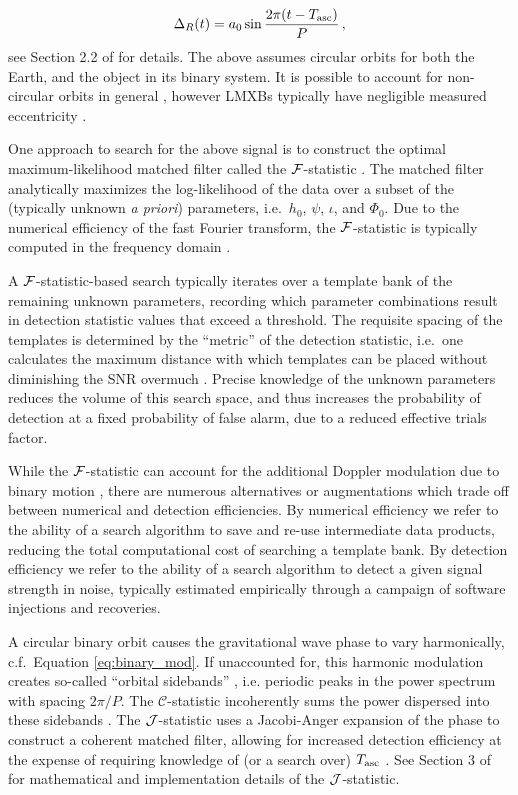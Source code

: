 \begin{equation}
    \Delta_R(t) = a_0 \sin \frac{2\pi(t - T_{\rm asc})}{P}\,, \label{eq:binary_mod}
\end{equation}
see Section 2.2 of \citet{Wette2023} for details. The above assumes circular orbits for both the Earth, and the object in its binary system. It is possible to account for non-circular orbits in general \citep{Leaci2015}, however LMXBs typically have negligible measured eccentricity \citep{Bhattacharyya2022}.

One approach to search for the above signal is to construct the optimal maximum-likelihood matched filter called the $\mathcal{F}$-statistic \citep{JKS98}. The matched filter analytically maximizes the log-likelihood of the data over a subset of the (typically unknown \emph{a priori}) parameters, i.e.~$h_0$, $\psi$, $\iota$, and $\Phi_0$. Due to the numerical efficiency of the fast Fourier transform, the $\mathcal{F}$-statistic is typically computed in the frequency domain \citep{JKS98,Prix2009a}.

A $\mathcal{F}$-statistic-based search typically iterates over a template bank of the remaining unknown parameters, recording which parameter combinations result in detection statistic values that exceed a threshold. The requisite spacing of the templates is determined by the ``metric'' of the detection statistic, i.e.~one calculates the maximum distance with which templates can be placed without diminishing the SNR overmuch \citep{Leaci2015}. Precise knowledge of the unknown parameters reduces the volume of this search space, and thus increases the probability of detection at a fixed probability of false alarm, due to a reduced effective trials factor.

While the $\mathcal{F}$-statistic can account for the additional Doppler modulation due to binary motion \citep{LAL2018}, there are numerous alternatives or augmentations which trade off between numerical and detection efficiencies. By numerical efficiency we refer to the ability of a search algorithm to save and re-use intermediate data products, reducing the total computational cost of searching a template bank. By detection efficiency we refer to the ability of a search algorithm to detect a given signal strength in noise, typically estimated empirically through a campaign of software injections and recoveries. 

A circular binary orbit causes the gravitational wave phase to vary harmonically, c.f.~Equation \eqref{eq:binary_mod}. If unaccounted for, this harmonic modulation creates so-called ``orbital sidebands'' \citep{Messenger2007,Sammut2014}, i.e. periodic peaks in the power spectrum with spacing $2\pi/P$. The $\mathcal{C}$-statistic incoherently sums the power dispersed into these sidebands \citep{Sammut2014}. The $\mathcal{J}$-statistic uses a Jacobi-Anger expansion of the phase to construct a coherent matched filter, allowing for increased detection efficiency at the expense of requiring knowledge of (or a search over) $T_{\rm asc}$ \citep{Suvorova2017}. See Section 3 of \citet{Suvorova2017} for mathematical and implementation details of the $\mathcal{J}$-statistic.

